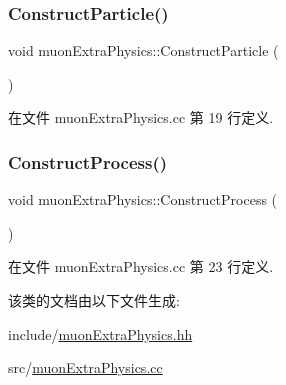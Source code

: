 \subsubsection{\texorpdfstring{Construct\+Particle()}{ConstructParticle()}}
{\footnotesize\ttfamily void muon\+Extra\+Physics\+::\+Construct\+Particle (\begin{DoxyParamCaption}{ }\end{DoxyParamCaption})\hspace{0.3cm}{\ttfamily [virtual]}}



在文件 muon\+Extra\+Physics.\+cc 第 19 行定义.

\mbox{\label{classmuonExtraPhysics_acd8e6a94a2520746e6ae7cf342b83db5}} 
\subsubsection{\texorpdfstring{Construct\+Process()}{ConstructProcess()}}
{\footnotesize\ttfamily void muon\+Extra\+Physics\+::\+Construct\+Process (\begin{DoxyParamCaption}{ }\end{DoxyParamCaption})\hspace{0.3cm}{\ttfamily [virtual]}}



在文件 muon\+Extra\+Physics.\+cc 第 23 行定义.



该类的文档由以下文件生成\+:\begin{DoxyCompactItemize}
\item 
include/\hyperlink{muonExtraPhysics_8hh}{muon\+Extra\+Physics.\+hh}\item 
src/\hyperlink{muonExtraPhysics_8cc}{muon\+Extra\+Physics.\+cc}\end{DoxyCompactItemize}

